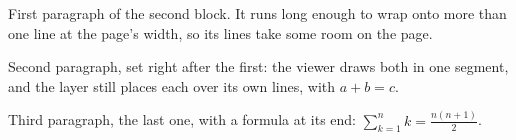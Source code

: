 First paragraph of the second block. It runs long enough to wrap onto more
than one line at the page's width, so its lines take some room on the page.

Second paragraph, set right after the first: the viewer draws both in one
segment, and the layer still places each over its own lines, with $a+b=c$.

Third paragraph, the last one, with a formula at its end:
$\sum_{k=1}^{n} k = \frac{n(n+1)}{2}$.
